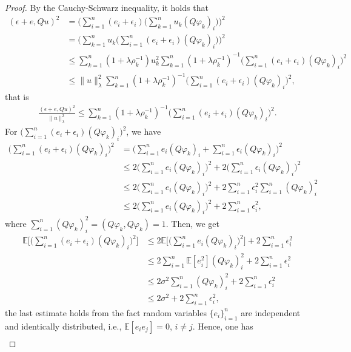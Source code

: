 \documentclass[11pt]{article}
\numberwithin{equation}{section}
\begin{document}
\begin{proof}
By the Cauchy-Schwarz inequality, it holds that
\begin{align*}
(\epsilon+e,Qu)^2
&=\bigg(\sum_{i=1}^n(e_i+\epsilon_i)\bigg(\sum_{k=1}^nu_k(Q\varphi_k)_i\bigg)\bigg)^2\\
&=\bigg(\sum_{k=1}^nu_k\bigg(\sum_{i=1}^n(e_i+\epsilon_i)(Q\varphi_k)_i\bigg)\bigg)^2\\
&\leq \sum_{k=1}^n(1+\lambda\rho_k^{-1})u_k^2\sum_{k=1}^n(1+\lambda\rho_k^{-1})^{-1}\bigg(\sum_{i=1}^n(e_i+\epsilon_i)(Q\varphi_k)_i\bigg)^2\\
&\leq \| u\|_{\lambda}^2\sum_{k=1}^n(1+\lambda\rho_k^{-1})^{-1}\bigg(\sum_{i=1}^n(e_i+\epsilon_i)(Q\varphi_k)_i\bigg)^2,
\end{align*}
that is
\begin{align*}
\frac{(\epsilon+e,Qu)^2}{\| u\|_{\lambda}^2}
\leq \sum_{k=1}^n(1+\lambda\rho_k^{-1})^{-1}\bigg(\sum_{i=1}^n(e_i+\epsilon_i)(Q\varphi_k)_i\bigg)^2.
\end{align*}
For $\big(\sum_{i=1}^n(e_i+\epsilon_i)(Q\varphi_k)_i\big)^2$, we have
\begin{align*}
\bigg(\sum_{i=1}^n(e_i+\epsilon_i)(Q\varphi_k)_i\bigg)^2
&=\bigg(\sum_{i=1}^ne_i(Q\varphi_k)_i+\sum_{i=1}^n\epsilon_i(Q\varphi_k)_i\bigg)^2\\
&\leq 2\bigg(\sum_{i=1}^ne_i(Q\varphi_k)_i\bigg)^2+2\bigg(\sum_{i=1}^n\epsilon_i(Q\varphi_k)_i\bigg)^2\\
&\leq 2\bigg(\sum_{i=1}^ne_i(Q\varphi_k)_i\bigg)^2+2\sum_{i=1}^n\epsilon_i^2\sum_{i=1}^n(Q\varphi_k)_i^2\\
&\leq 2\bigg(\sum_{i=1}^ne_i(Q\varphi_k)_i\bigg)^2+2\sum_{i=1}^n\epsilon_i^2,
\end{align*}
where $\sum_{i=1}^n(Q\varphi_k)_i^2=(Q\varphi_k,Q\varphi_k)=1$.
Then, we get
\begin{align*}
\mathbb{E}\bigg[\bigg(\sum_{i=1}^n(e_i+\epsilon_i)(Q\varphi_k)_i\bigg)^2\bigg]
&\leq 2\mathbb{E}\bigg[\bigg(\sum_{i=1}^ne_i(Q\varphi_k)_i\bigg)^2\bigg]+2\sum_{i=1}^n\epsilon_i^2\\&
\leq 2\sum_{i=1}^n\mathbb{E}[e_i^2](Q\varphi_k)_i^2+2\sum_{i=1}^n\epsilon_i^2\\
&\leq 2\sigma^2\sum_{i=1}^n(Q\varphi_k)_i^2+2\sum_{i=1}^n\epsilon_i^2\\
&\leq 2\sigma^2+2\sum_{i=1}^n\epsilon_i^2,
\end{align*}
the last estimate holds from the fact random variables $\{e_i\}_{i=1}^n$ are independent and identically distributed, i.e., $\mathbb{E}[e_ie_j]=0$, $i\neq j$. Hence, one has
\begin{align*}

\end{align*}
\end{proof}
\end{document}
